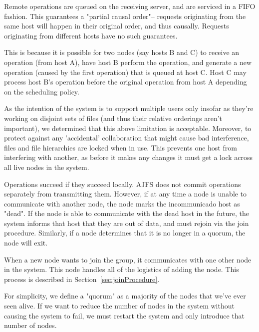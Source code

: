 Remote operations are queued on the receiving server, and are serviced in a FIFO
fashion. This guarantees a "partial causal order"-- requests originating
from the same host will happen in their original order, and thus causally.
Requests originating from different hosts have no such guarantees.

This is because it is possible for two nodes (say hosts B and C) to receive an
operation (from host A), have host B perform the operation, and generate a new
operation (caused by the first operation) that is queued at host C. Host C may
process host B's operation before the original operation from host A depending
on the scheduling policy.

As the intention of the system is to support multiple users only insofar as
they're working on disjoint sets of files (and thus their relative orderings
aren't important), we determined that this above limitation is acceptable.
Moreover, to protect against any 'accidental' collaboration that might cause bad
interference, files and file hierarchies are locked when in use. This prevents
one host from interfering with another, as before it makes any changes it must
get a lock across all live nodes in the system.

Operations succeed if they succeed locally. AJFS does not commit operations
separately from transmitting them. However, if at any time a node is unable to
communicate with another node, the node marks the incommunicado host as "dead".
If the node is able to communicate with the dead host in the future, the system
informs that host that they are out of data, and must rejoin via the join
procedure. Similarly, if a node determines that it is no longer in a quorum,
the node will exit.

When a new node wants to join the group, it communicates with one other node in
the system. This node handles all of the logistics of adding the node. This
process is described in Section~\ref{sec:joinProcedure}.

For simplicity, we define a "quorum" as a majority of the nodes that we've ever
seen alive. If we want to reduce the number of nodes in the system without
causing the system to fail, we must restart the system and only introduce that
number of nodes.

